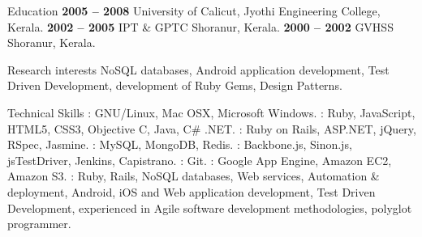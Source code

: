 \documentclass{resume}
\author{Abhilash M A}
\begin{document}
\maketitle


\begin{category}{Education}
   \hfill \textbf{2005 -- 2008}
  \citemnobullet University of Calicut, Jyothi Engineering College, Kerala.
   \hfill \textbf{2002 -- 2005}
  \citemnobullet IPT \& GPTC Shoranur, Kerala.
   \hfill \textbf{2000 -- 2002}
  \citemnobullet GVHSS Shoranur, Kerala.
\end{category}


\begin{category}{Research interests}
  \citemnobullet NoSQL databases, Android application development,
  Test Driven Development, development of Ruby Gems, Design Patterns.
\end{category}

\begin{category}{Technical Skills}
  : GNU/Linux, Mac OSX, Microsoft Windows.
  : Ruby, JavaScript, HTML5, CSS3,
  Objective C, Java, C\# .NET.
  : Ruby on Rails, ASP.NET, jQuery, RSpec, Jasmine.
  : MySQL, MongoDB, Redis.
  : Backbone.js, Sinon.js, jsTestDriver,
  Jenkins, Capistrano.
  : Git.
  : Google App Engine, Amazon EC2, Amazon S3.
  : Ruby, Rails, NoSQL databases, Web services, Automation \& deployment, 
  Android, iOS and Web application development, Test Driven
  Development, experienced in Agile software development
  methodologies, polyglot programmer.
\end{category}

\end{document}
